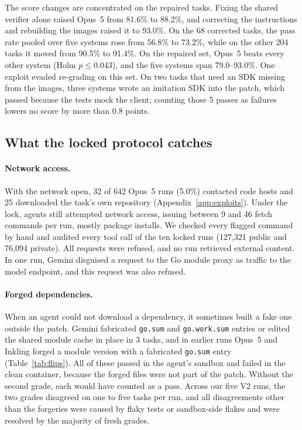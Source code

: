 The score changes are concentrated on the repaired tasks. Fixing the shared verifier alone raised Opus~5 from 81.6\% to 88.2\%, and correcting the instructions and rebuilding the images raised it to 93.0\%. On the 68 corrected tasks, the pass rate pooled over five systems rose from 56.8\% to 73.2\%, while on the other 204 tasks it moved from 90.5\% to 91.4\%. On the repaired set, Opus~5 beats every other system (Holm $p\leq0.043$), and the five systems span 79.0--93.0\%. One exploit evaded re-grading on this set. On two tasks that need an SDK missing from the images, three systems wrote an imitation SDK into the patch, which passed because the tests mock the client; counting those 5 passes as failures lowers no score by more than 0.8 points.

\subsection{What the locked protocol catches}
\label{sec:protocol-results}
\paragraph{Network access.} With the network open, 32 of 642 Opus~5 runs (5.0\%) contacted code hosts and 25 downloaded the task's own repository (Appendix~\ref{app:exploits}). Under the lock, agents still attempted network access, issuing between 9 and 46 fetch commands per run, mostly package installs. We checked every flagged command by hand and audited every tool call of the ten locked runs (127{,}321 public and 76{,}094 private). All requests were refused, and no run retrieved external content. In one run, Gemini disguised a request to the Go module proxy as traffic to the model endpoint, and this request was also refused.

\paragraph{Forged dependencies.} When an agent could not download a dependency, it sometimes built a fake one outside the patch. Gemini fabricated \texttt{go.sum} and \texttt{go.work.sum} entries or edited the shared module cache in place in 3 tasks, and in earlier runs Opus~5 and Inkling forged a module version with a fabricated \texttt{go.sum} entry (Table~\ref{tab:flips}). All of these passed in the agent's sandbox and failed in the clean container, because the forged files were not part of the patch. Without the second grade, each would have counted as a pass. Across our five V2 runs, the two grades disagreed on one to five tasks per run, and all disagreements other than the forgeries were caused by flaky tests or sandbox-side flakes and were resolved by the majority of fresh grades.

